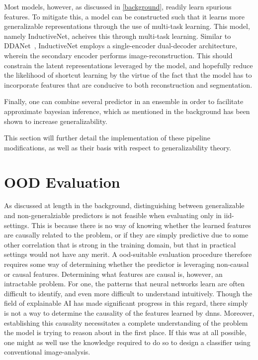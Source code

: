 Most models, however, as discussed in \ref{background}, readily learn spurious features. To mitigate this, a model can be constructed such that it learns more generalizable representations through the use of multi-task learning. This model, namely InductiveNet, acheives this through multi-task learning. Similar to DDANet~\cite{ddanet}, InductiveNet employs a single-encoder dual-decoder architecture, wherein the secondary encoder performs image-reconstruction. This should constrain the latent representations leveraged by the model, and hopefully reduce the likelihood of shortcut learning by the virtue of the fact that the model has to incorporate features that are conducive to both reconstruction and segmentation.

Finally, one can combine several predictor in an ensemble in order to facilitate approximate bayesian inference, which as mentioned in the background has been shown to increase generalizability. 

This section will further detail the implementation of these pipeline modifications, as well as their basis with respect to generalizability theory.

\section{OOD Evaluation}
As discussed at length in the background, distinguishing between generalizable and non-generalziable predictors is not feasible when evaluating only in iid-settings. This is because there is no way of knowing whether the learned features are causally related to the problem, or if they are simply predictive due to some other correlation that is strong in the training domain, but that in practical settings would not have any merit. A \gls{ood}-suitable evaluation procedure therefore requires some way of determining whether the predictor is leveraging non-causal or causal features. Determining what features are causal is, however, an intractable problem. For one, the patterns that neural networks learn are often difficult to identify, and even more difficult to understand intuitively. Though the field of explainable AI has made significant progress in this regard, there simply is not a way to determine the causality of the features learned by \glspl{dnn}. Moreover, establishing  this causality necessitates a complete understanding of the problem the model is trying to reason about in the first place. If this was at all possible, one might as well use the knowledge required to do so to design a classifier using conventional image-analysis. 

